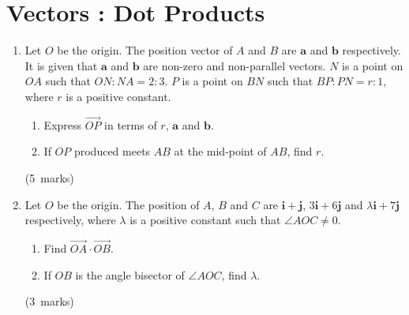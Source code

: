\documentclass[12pt, a4paper]{article} %
\newcommand{\qmarks}[1]{\leavevmode\unskip\hspace*{\fill}\mbox{(#1 marks)}}
\begin{document}
\section{Vectors : Dot Products}
\begin{enumerate}
    \item Let \(O\) be the origin. The position vector of \(A\) and \(B\) are \(\mathbf{a}\) and \(\mathbf{b}\) respectively. It is given that \(\mathbf{a}\) and \(\mathbf{b}\) are non-zero and non-parallel vectors. \(N\) is a point on \(OA\) such that \(ON:NA=2:3\). \(P\) is a point on \(BN\) such that \(BP:PN=r:1\), where \(r\) is a positive constant.
    \begin{enumerate}
        \item Express \(\overrightarrow{OP}\) in terms of \(r\), \(\mathbf{a}\) and \(\mathbf{b}\).
        \item If \(OP\) produced meets \(AB\) at the mid-point of \(AB\), find \(r\).
    \end{enumerate} \qmarks{5}

    \item Let \(O\) be the origin. The position of \(A\), \(B\) and \(C\) are \(\mathbf{i}+\mathbf{j}\), \(3\mathbf{i}+6\mathbf{j}\) and \(\lambda \mathbf{i}+7\mathbf{j}\) respectively, where \(\lambda\) is a positive constant such that \(\angle AOC \neq 0\).
    \begin{enumerate}
        \item Find \(\overrightarrow{OA} \cdot \overrightarrow{OB}\).
        \item If \(OB\) is the angle bisector of \(\angle AOC\), find \(\lambda\).
    \end{enumerate}\qmarks{3}


\end{enumerate}
\end{document}
